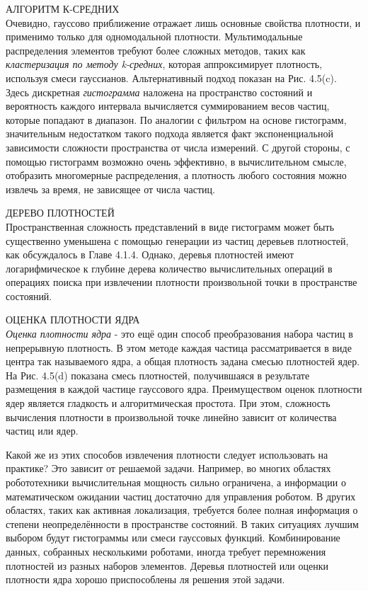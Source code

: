 \documentclass[10pt,a4paper]{article}
\begin{document}
АЛГОРИТМ К-СРЕДНИХ \\
Очевидно, гауссово приближение отражает лишь основные свойства плотности, и применимо только для одномодальной плотности. Мультимодальные распределения элементов требуют более сложных методов, таких как \textit{кластеризация по методу k-средних}, которая аппроксимирует плотность, используя смеси гауссианов. Альтернативный подход показан на Рис. 4.5(c). Здесь дискретная \textit{гистограмма} наложена на пространство состояний и вероятность каждого интервала вычисляется суммированием весов частиц, которые попадают в диапазон. По аналогии с фильтром на основе гистограмм, значительным недостатком такого подхода является факт экспоненциальной зависимости сложности пространства от числа измерений. С другой стороны, с помощью гистограмм возможно очень эффективно, в вычислительном смысле, отобразить многомерные распределения, а плотность любого состояния можно извлечь за время, не зависящее от числа частиц.

ДЕРЕВО ПЛОТНОСТЕЙ\\
Пространственная сложность представлений в виде гистограмм может быть существенно уменьшена с помощью генерации из частиц деревьев плотностей, как обсуждалось в Главе 4.1.4. Однако, деревья плотностей имеют логарифмическое к глубине дерева количество вычислительных операций в операциях поиска при извлечении плотности произвольной точки в пространстве состояний.

ОЦЕНКА ПЛОТНОСТИ ЯДРА\\ 
\textit{Оценка плотности ядра} - это ещё один способ преобразования набора частиц в непрерывную плотность. В этом методе каждая частица рассматривается в виде центра так называемого ядра, а общая плотность задана смесью плотностей ядер. На Рис. 4.5(d) показана смесь плотностей, получившаяся в результате размещения в каждой частице гауссового ядра. Преимуществом оценок плотности ядер является гладкость и алгоритмическая простота. При этом, сложность вычисления плотности в произвольной точке линейно зависит от количества частиц или ядер. 

Какой же из этих способов извлечения плотности следует использовать на практике? 
Это зависит от решаемой задачи. Например, во многих областях робототехники вычислительная мощность сильно ограничена, а информации о математическом ожидании частиц достаточно  для управления роботом. В других областях, таких как активная локализация, требуется более полная информация о степени неопределённости в пространстве состояний. В таких ситуациях лучшим выбором будут гистограммы или смеси гауссовых функций. Комбинирование данных, собранных несколькими роботами, иногда требует перемножения плотностей из разных наборов элементов. Деревья плотностей или оценки плотности ядра хорошо приспособлены ля решения этой задачи.\\
\end{document}
